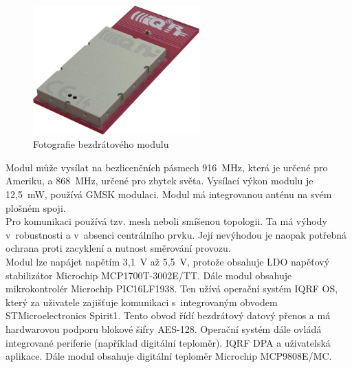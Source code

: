 \documentclass[12pt,a4paper,oneside]{article}
\begin{document}
\begin{figure}[H]
\centering
\label{fig:iqrf/fotka}
\includegraphics[width = 64mm]{img/iqrf/dctr-72dat.png}
\caption{Fotografie bezdrátového modulu}
\end{figure}

Modul může vysílat na bezlicenčních pásmech 916~MHz, která je určené pro Ameriku, a 868~MHz, určené pro zbytek světa. Vysílací výkon modulu je 12,5~mW, používá GMSK modulaci. Modul má integrovanou anténu na svém plošném spoji. \\

Pro komunikaci používá tzv. mesh neboli smíšenou topologii. Ta má výhody v~robustnosti a v~absenci centrálního prvku. Její nevýhodou je naopak potřebná ochrana proti zacyklení a nutnost směrování provozu. \\

Modul lze napájet napětím 3,1~V až 5,5~V, protože obsahuje LDO napěťový stabilizátor Microchip MCP1700T-3002E/TT. Dále modul obsahuje mikrokontrolér Microchip PIC16LF1938. Ten užívá operační systém IQRF OS, který za uživatele zajišťuje komunikaci s~integrovaným obvodem STMicroelectronics Spirit1. Tento obvod řídí bezdrátový datový přenos a má hardwarovou podporu blokové šifry AES-128. Operační systém dále ovládá integrované periferie (například digitální teploměr). IQRF DPA a uživatelská aplikace. Dále modul obsahuje digitální teploměr Microchip MCP9808E/MC. \\ 
\end{document}
